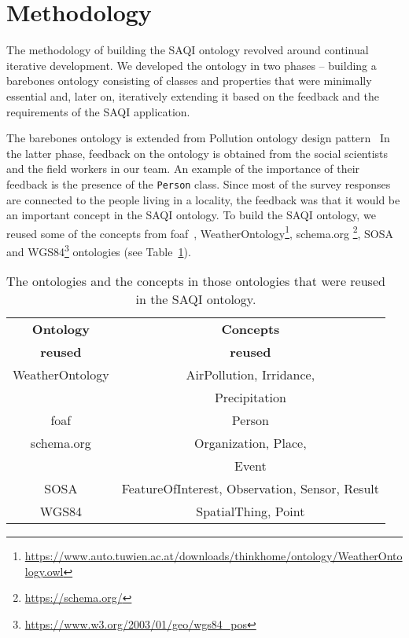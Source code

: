 \section{Methodology}
\label{sec:methodology}

The methodology of building the SAQI ontology revolved around continual iterative development. We developed the ontology in two phases -- building a barebones ontology consisting of classes and properties that were minimally essential and, later on, iteratively extending it based on the feedback and the requirements of the SAQI application. 


The barebones ontology is extended from Pollution ontology design pattern~\cite{Saad-PollutionODP-WOP2021}
In the latter phase, feedback on the ontology is obtained from the social scientists and the field workers in our team. An example of the importance of their feedback is the presence of the \texttt{Person} class. Since most of the survey responses are connected to the people living in a locality, the feedback was that it would be an important concept in the SAQI ontology. To build the SAQI ontology, we reused some of the concepts from foaf~\cite{brickley-d-2004--b}, WeatherOntology\footnote{\url{https://www.auto.tuwien.ac.at/downloads/thinkhome/ontology/WeatherOntology.owl}}, schema.org \footnote{\url{https://schema.org/}}, SOSA~\cite{SOSA-JWS2019} and WGS84\footnote{\url{https://www.w3.org/2003/01/geo/wgs84_pos}} ontologies (see Table~\ref{tab:ont-reused}).


\begin{table}[ht]
\small
\centering
\caption{The ontologies and the concepts in those ontologies that were reused in the SAQI ontology.}
\label{tab:ont-reused}
\begin{tabular}{cc} 
 \hline
 \textbf{Ontology} & \textbf{Concepts} \\ %
 \textbf{reused} & \textbf{reused} \\
 \hline
 WeatherOntology & AirPollution, Irridance, \\
  & Precipitation \\ 
 foaf & Person \\ %
 schema.org & Organization, Place, \\
  & Event \\ %
 SOSA & FeatureOfInterest, Observation, Sensor, Result \\ 
 WGS84 & SpatialThing, Point \\
 \hline
\end{tabular}
\end{table}

